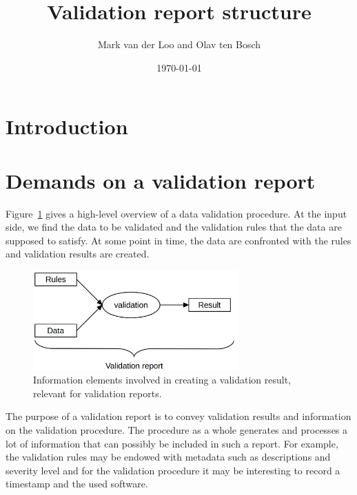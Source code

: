 \documentclass[a4paper, 11pt]{article}
\title{Validation report structure}
\author{Mark van der Loo and Olav ten Bosch}
\date{\today}
\begin{document}
\maketitle{}

\tableofcontents{}


\section{Introduction}

\section{Demands on a validation report}
Figure~\ref{fig:validation} gives a high-level overview of a data validation
procedure. At the input side, we find the data to be validated and the
validation rules that the data are supposed to satisfy. At some point in time,
the data are confronted with the rules and validation results are created. 
%
\begin{figure}[t]
\centering
\includegraphics[width=0.7\textwidth]{fig/validation.png}
\caption{Information elements involved in creating a validation result, relevant for validation reports.}
\label{fig:validation}
\end{figure}

The purpose of a validation report is to convey validation results and
information on the validation procedure. The procedure as a whole generates and
processes a lot of information that can possibly be included in such a report.
For example, the validation rules may be endowed with metadata such as
descriptions and severity level and for the validation procedure it may be
interesting to record a timestamp and the used software.
\end{document}
